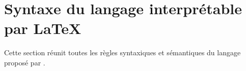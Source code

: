 \documentclass{tutodoc}
\begin{document}
\section{Syntaxe du langage interprétable par \LaTeX} \label{tns-math-functab-dsl-l3}

Cette section réunit toutes les règles syntaxiques et sémantiques du langage proposé par \thisproj.
\end{document}
